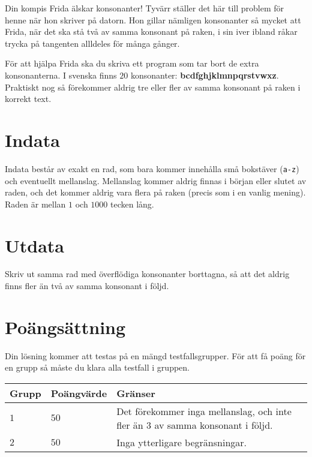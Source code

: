 Din kompis Frida älskar konsonanter! Tyvärr ställer det här till problem för henne när hon skriver på datorn. Hon gillar nämligen konsonanter så mycket att Frida, när det ska stå två av samma konsonant på raken, i sin iver ibland råkar trycka på tangenten allldeles för många gånger.

För att hjälpa Frida ska du skriva ett program som tar bort de extra konsonanterna. I svenska finns $20$ konsonanter: \textbf{bcdfghjklmnpqrstvwxz}. Praktiskt nog så förekommer aldrig tre eller fler av samma konsonant på raken i korrekt text.

\section*{Indata}
Indata består av exakt en rad, som bara kommer innehålla små bokstäver (\texttt{a-z}) och eventuellt mellanslag. Mellanslag kommer aldrig finnas i början eller slutet av raden, och det kommer aldrig vara flera på raken (precis som i en vanlig mening). Raden är mellan $1$ och $1000$ tecken lång.

\section*{Utdata}
Skriv ut samma rad med överflödiga konsonanter borttagna, så att det aldrig finns fler än två av samma konsonant i följd.

\section*{Poängsättning}
Din lösning kommer att testas på en mängd testfallsgrupper.
För att få poäng för en grupp så måste du klara alla testfall i gruppen.

\noindent
\begin{tabular}{| l | l | p{12cm} |}
  \hline
  Grupp & Poängvärde & Gränser \\ \hline
    $1$   & $50$     & Det förekommer inga mellanslag, och inte fler än 3 av samma konsonant i följd. \\ \hline
    $2$   & $50$     & Inga ytterligare begränsningar. \\ \hline
\end{tabular}
